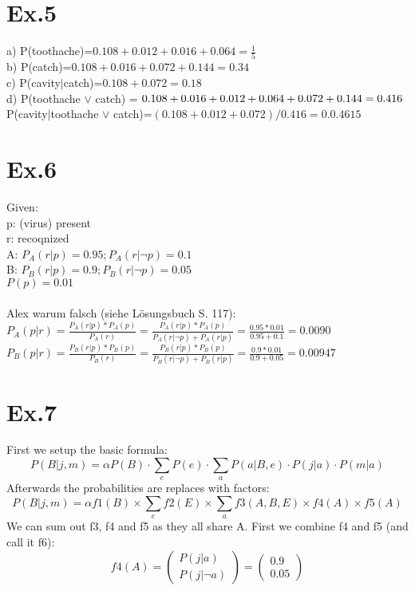 \documentclass[11pt]{article}
\begin{document}
\section*{Ex.5}
a) P(toothache)=$0.108+0.012+0.016+0.064=\frac{1}{5}$\\
b) P(catch)=$0.108+0.016+0.072+0.144=0.34$\\
c) P(cavity$|$catch)=$0.108+0.072=0.18$\\
d) P(toothache $\vee$ catch) = $0.108+0.016+0.012+0.064+0.072+0.144=0.416\\
$P(cavity$|$toothache $\vee$ catch)=$(0.108+0.012+0.072)/0.416=0.0.4615$\\

\section*{Ex.6}

Given:\\
p: (virus) present\\
r: recoqnized\\
A: $P_A(r|p)=0.95; P_A(r|\neg p)=0.1$\\
B: $P_B(r|p)=0.9; P_B(r|\neg p)=0.05$\\
$P(p)=0.01$\\
\\
Alex warum falsch (siehe Lösungsbuch S. 117):\\
$P_A(p|r)=\frac{P_A(r|p)*P_A(p)}{P_A(r)}=\frac{P_A(r|p)*P_A(p)}{P_A(r|\neg p)+P_A(r|p)}=\frac{0.95*0.01}{0.95+0.1}=0.0090$\\
$P_B(p|r)=\frac{P_B(r|p)*P_B(p)}{P_B(r)}=\frac{P_B(r|p)*P_B(p)}{P_B(r|\neg p)+P_B(r|p)}=\frac{0.9*0.01}{0.9+0.05}=0.00947$\\

\section*{Ex.7}

First we setup the basic formula:
$$P(B|j,m) = \alpha P(B) \cdot \sum_{e}P(e) \cdot \sum_{a}P(a|B,e) \cdot P(j|a) \cdot P(m|a)$$
Afterwards the probabilities are replaces with factors:
$$P(B|j,m) = \alpha f1(B) \times \sum_{e}f2(E) \times \sum_{a}f3(A,B,E) \times f4(A) \times f5(A)$$
We can sum out f3, f4 and f5 as they all share A. First we combine f4 and f5 (and call it f6):
$$ f4(A) = 
\begin{pmatrix}
  P(j|a) \\
  P(j|\neg a)
\end{pmatrix}
 = 
\begin{pmatrix}
  0.9 \\
  0.05
\end{pmatrix}
$$ 
 
\end{document}
